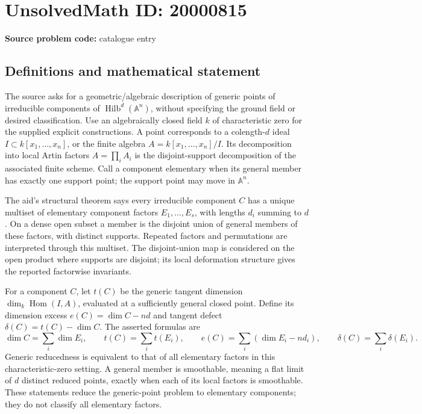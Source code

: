 \documentclass[11pt]{article}
\newcommand{\A}{\mathbb{A}}
\begin{document}
\section*{UnsolvedMath ID: 20000815}
\textbf{Source problem code:} catalogue entry
\subsection{Definitions and mathematical statement}
The source asks for a geometric/algebraic description of generic points of irreducible components of \(\operatorname{Hilb}^d(\A^n)\), without specifying the ground field or desired classification. Use an algebraically closed field \(k\) of characteristic zero for the supplied explicit constructions. A point corresponds to a colength-\(d\) ideal \(I\subset k[x_1,\ldots,x_n]\), or the finite algebra \(A=k[x_1,\ldots,x_n]/I\). Its decomposition into local Artin factors \(A=\prod_i A_i\) is the disjoint-support decomposition of the associated finite scheme. Call a component elementary when its general member has exactly one support point; the support point may move in \(\A^n\).

The aid's structural theorem says every irreducible component \(C\) has a unique multiset of elementary component factors \(E_1,\ldots,E_s\), with lengths \(d_i\) summing to \(d\). On a dense open subset a member is the disjoint union of general members of these factors, with distinct supports. Repeated factors and permutations are interpreted through this multiset. The disjoint-union map is considered on the open product where supports are disjoint; its local deformation structure gives the reported factorwise invariants.

For a component \(C\), let \(t(C)\) be the generic tangent dimension \(\dim_k\operatorname{Hom}(I,A)\), evaluated at a sufficiently general closed point. Define its dimension excess \(e(C)=\dim C-nd\) and tangent defect \(\delta(C)=t(C)-\dim C\). The asserted formulas are
\[
 \dim C=\sum_i\dim E_i,\qquad t(C)=\sum_i t(E_i),\qquad
 e(C)=\sum_i(\dim E_i-nd_i),\qquad
 \delta(C)=\sum_i\delta(E_i).
\]
Generic reducedness is equivalent to that of all elementary factors in this characteristic-zero setting. A general member is smoothable, meaning a flat limit of \(d\) distinct reduced points, exactly when each of its local factors is smoothable. These statements reduce the generic-point problem to elementary components; they do not classify all elementary factors.
\end{document}

